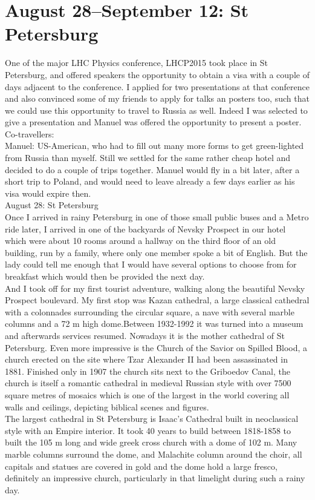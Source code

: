 \section{August 28--September 12: St Petersburg}
\label{2015:StPetersburg}

One of the major LHC Physics conference, LHCP2015 took place in St Petersburg, and offered speakers the opportunity to obtain a visa with a couple of days adjacent to the conference. I applied for two presentations at that conference and also convinced some of my friends to apply for talks an posters too, such that we could use this opportunity to travel to Russia as well. Indeed I was selected to give a presentation and Manuel was offered the opportunity to present a poster.\\

Co-travellers:\\
Manuel: US-American, who had to fill out many more forms to get green-lighted from Russia than myself. Still we settled for the same rather cheap hotel and decided to do a couple of trips together. Manuel would fly in a bit later, after a short trip to Poland, and would need to leave already a few days earlier as his visa would expire then.\\

August 28: St Petersburg\\
Once I arrived in rainy Petersburg in one of those small public buses and a Metro ride later, I arrived in one of the backyards of Nevsky Prospect in our hotel which were about 10 rooms around a hallway on the third floor of an old building, run by a family, where only one member spoke a bit of English.  But the lady could tell me enough that I would have several options to choose from for breakfast which would then be provided the next day.\\
And I took off for my first tourist adventure, walking along the beautiful Nevsky Prospect boulevard. My first stop was Kazan cathedral, a large classical cathedral with a colonnades surrounding the circular square, a nave with several marble columns and a 72 m high dome.Between 1932-1992 it was turned into a museum and afterwards services resumed. Nowadays it is the mother cathedral of St Petersburg. Even more impressive is the Church of the Savior on Spilled Blood, a church erected on the site where Tzar Alexander II had been assassinated in 1881. Finished only in 1907 the church sits next to the Griboedov Canal, the church is itself a romantic cathedral in medieval Russian style with over 7500 square metres of mosaics which is one of the largest in the world covering all walls and ceilings, depicting biblical scenes and figures.\\
The largest cathedral in St Petersburg is Isaac's Cathedral built in neoclassical style with an Empire interior. It took 40 years to build between 1818-1858 to built the 105 m long and wide greek cross church with a dome of 102 m. Many marble columns surround the dome, and Malachite column around the choir, all capitals and statues are covered in gold and the dome hold a large fresco, definitely an impressive church, particularly in that limelight during such a rainy day.\\ 

